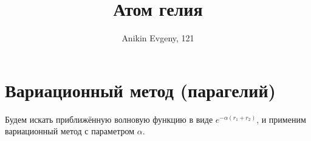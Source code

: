 \documentclass{article}
\title{Атом гелия}
\author{Anikin Evgeny, 121}
\begin{document}
\maketitle
\section{Вариационный метод (парагелий)}
Будем искать приближённую волновую функцию в виде $e^{-\alpha(r_1 + r_2)}$, 
и применим вариационный метод с параметром $\alpha$. 
\end{document}

